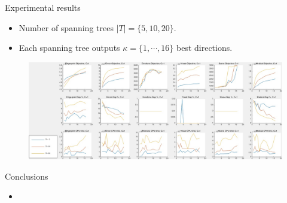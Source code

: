 \documentclass[first=dgreen,second=purple,logo=yellowexc]{aaltoslides}
\begin{document}
\begin{frame}{Experimental results}
	\begin{itemize}
		\item Number of spanning trees $|T|=\{5,10,20\}$.
		\item Each spanning tree outputs $\kappa=\{1,\cdots,16\}$ best directions.
	\end{itemize}
	\begin{figure}
		\begin{center}
			\includegraphics[scale=0.22]{./slide_overall_objective.jpg}
		\end{center}
	\end{figure}
\end{frame}






%
\begin{frame}{Conclusions}
	\begin{itemize}\footnotesize
		\item 
	\end{itemize}
\end{frame}

\end{document}

